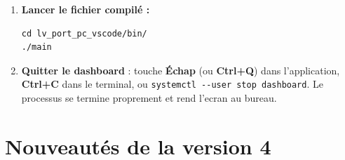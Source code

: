 \documentclass[a4paper,11pt]{article}
\begin{document}
\begin{enumerate}
  \item \textbf{Lancer le fichier compilé :}
  \begin{lstlisting}[style=bashcode]
cd lv_port_pc_vscode/bin/
./main
  \end{lstlisting}

  \item \textbf{Quitter le dashboard} : touche \textbf{Échap} (ou \textbf{Ctrl+Q}) dans
  l'application, \textbf{Ctrl+C} dans le terminal, ou \texttt{systemctl -{}-user stop dashboard}.
  Le processus se termine proprement et rend l'ecran au bureau.

\end{enumerate}

\section{Nouveautés de la version 4}
\end{document}
